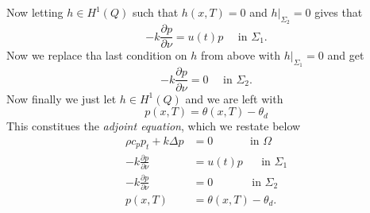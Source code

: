 Now letting $h\in H^1(Q)$ such that $h(x, T) = 0$ and $h|_{\Sigma_2}=0$ gives that
\begin{equation*}
  -k\frac{\partial p}{\partial\nu} = u(t)p \quad\textrm{ in } \Sigma_1.
\end{equation*}
Now we replace tha last condition on $h$ from above with $h|_{\Sigma_1}=0$ and get
\begin{equation*}
  -k\frac{\partial p}{\partial\nu} = 0 \quad\textrm{ in } \Sigma_2.
\end{equation*}
Now finally we just let $h\in H^1(Q)$ and we are left with
\begin{equation*}
  p(x, T) = \theta(x, T) - \theta_d
\end{equation*}
This constitues the \textit{adjoint equation}, which we restate below
\begin{subequations}
   \label{eq:adjoint-eqn}
   \begin{align} %
      \rho c_p p_t + k\Delta p &= 0 \quad\qquad\textrm{ in } \Omega \\
      -k\frac{\partial p}{\partial\nu} &= u(t)p \,\,\quad\textrm{ in } \Sigma_1 \\
      -k\frac{\partial p}{\partial\nu} &= 0 \,\quad\qquad\textrm{ in } \Sigma_2 \\
      p(x, T) &= \theta(x, T) - \theta_d.
   \end{align}
\end{subequations}
